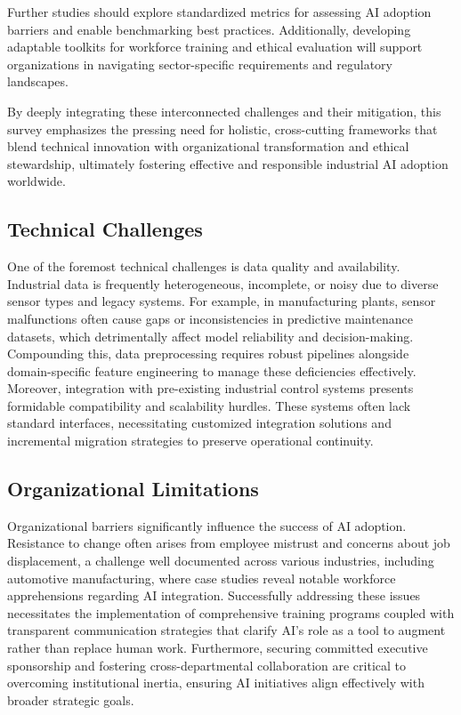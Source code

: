 \documentclass[sigconf]{acmart}
\begin{document}
Further studies should explore standardized metrics for assessing AI adoption barriers and enable benchmarking best practices. Additionally, developing adaptable toolkits for workforce training and ethical evaluation will support organizations in navigating sector-specific requirements and regulatory landscapes.

By deeply integrating these interconnected challenges and their mitigation, this survey emphasizes the pressing need for holistic, cross-cutting frameworks that blend technical innovation with organizational transformation and ethical stewardship, ultimately fostering effective and responsible industrial AI adoption worldwide.

\subsection{Technical Challenges}

One of the foremost technical challenges is data quality and availability. Industrial data is frequently heterogeneous, incomplete, or noisy due to diverse sensor types and legacy systems. For example, in manufacturing plants, sensor malfunctions often cause gaps or inconsistencies in predictive maintenance datasets, which detrimentally affect model reliability and decision-making. Compounding this, data preprocessing requires robust pipelines alongside domain-specific feature engineering to manage these deficiencies effectively. Moreover, integration with pre-existing industrial control systems presents formidable compatibility and scalability hurdles. These systems often lack standard interfaces, necessitating customized integration solutions and incremental migration strategies to preserve operational continuity.

\subsection{Organizational Limitations}

Organizational barriers significantly influence the success of AI adoption. Resistance to change often arises from employee mistrust and concerns about job displacement, a challenge well documented across various industries, including automotive manufacturing, where case studies reveal notable workforce apprehensions regarding AI integration. Successfully addressing these issues necessitates the implementation of comprehensive training programs coupled with transparent communication strategies that clarify AI's role as a tool to augment rather than replace human work. Furthermore, securing committed executive sponsorship and fostering cross-departmental collaboration are critical to overcoming institutional inertia, ensuring AI initiatives align effectively with broader strategic goals.
\end{document}
